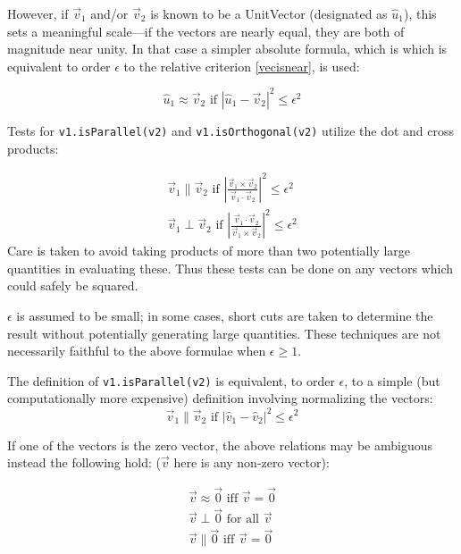 \noindent
However, if $\vec{v}_{1}$ and/or $\vec{v}_2$ is known to be a UnitVector
(designated as $\hat{u}_{1}$), this sets a meaningful scale---if the
vectors are nearly equal, they are both of magnitude near unity.
In that case a simpler absolute formula, which is which is equivalent
to order $\epsilon$ to the relative criterion \ref{vecisnear}, is used:

\begin{equation}
\hat{u}_{1} \approx \vec{v}_{2} \mbox{ if }
  \left| \hat{u}_{1} - \vec{v}_{2} \right| ^ 2 \leq \epsilon^2
\end{equation}

\noindent
Tests for {\tt v1.isParallel(v2)}
and {\tt v1.isOrthogonal(v2)} utilize the dot and
cross products:

\begin{eqnarray}
\vec{v}_{1} \parallel \vec{v}_{2} \mbox{ if }
  \left| \frac{\vec{v}_{1} \times \vec{v}_{2}}
  {\vec{v}_{1} \cdot  \vec{v}_{2}}  \right| ^2
  \le \epsilon^2
  \label{eq:isPar} \\
\vec{v}_{1} \perp \vec{v}_{2} \mbox{ if }
  \left| \frac{\vec{v}_{1} \cdot \vec{v}_{2}}
  {\vec{v}_{1} \times  \vec{v}_{2}}  \right| ^2
  \le \epsilon^2
  \label{eq:isOrtho}
\end{eqnarray}
\noindent
Care is taken to avoid taking products of more than two potentially large
quantities in evaluating these.  Thus these tests can be done on any vectors
which could safely be squared.

\noindent
$\epsilon$ is assumed to be small; in some cases, short cuts are taken
to determine the result without potentially generating large quantities.
These techniques are not necessarily faithful to the above formulae when
$\epsilon \ge 1$.

\noindent
The definition of {\tt v1.isParallel(v2)} is equivalent, to order $\epsilon$,
to a simple (but computationally more expensive) definition involving
normalizing the vectors:
\begin{displaymath}
  \vec{v}_{1} \parallel \vec{v}_{2} \mbox{ if }
  	\left| \hat{v}_{1} - \hat{v}_{2} \right| ^2  \le \epsilon^2
\end{displaymath}


\noindent
If one of the vectors is the zero vector, the above relations may be ambiguous
instead the following hold:
($\vec{v}$ here is any non-zero vector):

\begin{eqnarray}
  \vec{v} \approx \vec{0} \mbox{ iff } \vec{v} = \vec{0} \\
  \vec{v} \perp \vec{0} \mbox{ for all } \vec{v} \\
  \vec{v} \parallel \vec{0} \mbox{ iff } \vec{v} = \vec{0}
\end{eqnarray}

